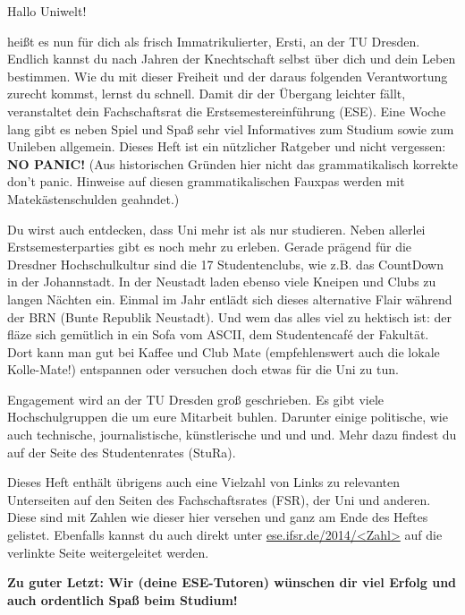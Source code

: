 
Hallo Uniwelt!

heißt es nun für dich als frisch Immatrikulierter, Ersti, an der TU Dresden. 
Endlich kannst du nach Jahren der Knechtschaft selbst über dich und dein Leben bestimmen. 
Wie du mit dieser Freiheit und der daraus folgenden Verantwortung zurecht kommst, lernst du schnell. 
Damit dir der Übergang leichter fällt, veranstaltet dein Fachschaftsrat die Erstsemestereinführung (ESE). 
Eine Woche lang gibt es neben Spiel und Spaß sehr viel Informatives zum Studium sowie zum Unileben allgemein. 
Dieses Heft ist ein nützlicher Ratgeber und nicht vergessen: 
\textbf{NO PANIC!} (Aus historischen Gründen hier nicht das grammatikalisch korrekte \glqq don't panic\grqq. Hinweise auf diesen grammatikalischen Fauxpas werden mit Matekästenschulden geahndet.)

Du wirst auch entdecken, dass Uni mehr ist als nur studieren. 
Neben allerlei Erstsemesterparties gibt es noch mehr zu erleben. 
Gerade prägend für die Dresdner Hochschulkultur sind die 17 Studentenclubs, wie z.B. das CountDown in der Johannstadt. 
In der Neustadt laden ebenso viele Kneipen und Clubs zu langen Nächten ein. 
Einmal im Jahr entlädt sich dieses alternative Flair während der BRN (Bunte Republik Neustadt). 
Und wem das alles viel zu hektisch ist: der fläze sich gemütlich in ein Sofa vom ASCII, dem Studentencafé der Fakultät. 
Dort kann man gut bei Kaffee und Club Mate (empfehlenswert auch die lokale Kolle-Mate!) entspannen oder versuchen doch etwas für die Uni zu tun.

Engagement wird an der TU Dresden groß geschrieben. 
Es gibt viele Hochschulgruppen die um eure Mitarbeit buhlen. 
Darunter einige politische, wie auch technische, journalistische, künstlerische und und und. Mehr dazu findest du auf der Seite des Studentenrates (StuRa).

Dieses Heft enthält übrigens auch eine Vielzahl von Links zu relevanten Unterseiten auf den Seiten des Fachschaftsrates (FSR), der Uni und anderen. 
Diese sind mit Zahlen wie dieser hier  versehen und ganz am Ende des Heftes gelistet. Ebenfalls kannst du auch direkt unter \url{ese.ifsr.de/2014/<Zahl>} auf die verlinkte Seite weitergeleitet werden.

\textbf{Zu guter Letzt: Wir (deine ESE-Tutoren) wünschen dir viel Erfolg und auch ordentlich Spaß beim Studium!}

